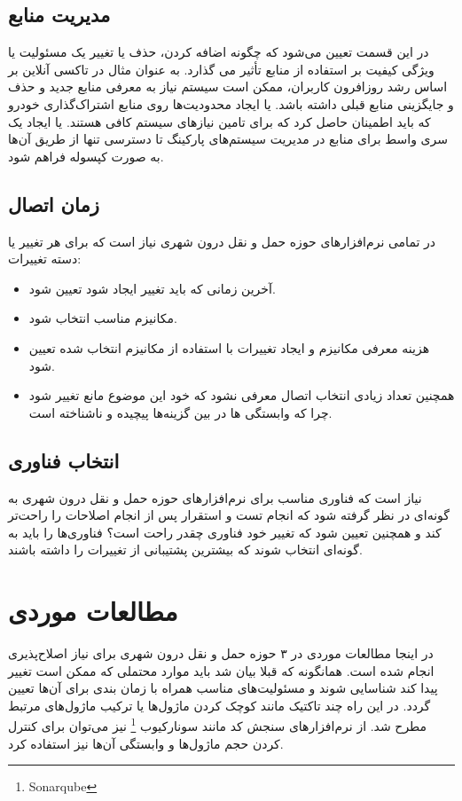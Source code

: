 \subsection{مدیریت منابع}
در این قسمت تعیین می‌شود که چگونه اضافه کردن، حذف یا تغییر یک مسئولیت یا ویژگی کیفیت بر استفاده از منابع تأثیر می گذارد. به عنوان مثال در تاکسی آنلاین بر اساس رشد روزافرون کاربران، ممکن است سیستم نیاز به معرفی منابع جدید و حذف و جایگزینی منابع قبلی داشته باشد. یا ایجاد محدودیت‌ها روی منابع اشتراک‌گذاری خودرو که باید اطمینان حاصل کرد که برای تامین نیازهای سیستم کافی هستند. یا ایجاد یک سری واسط برای منابع در مدیریت سیستم‌های پارکینگ تا دسترسی تنها از طریق آن‌ها به صورت کپسوله فراهم شود.
\subsection{زمان اتصال}
در تمامی نرم‌افزارهای حوزه حمل و نقل درون شهری نیاز است که برای هر تغییر یا دسته تغییرات:
\begin{itemize}
\item
آخرین زمانی که باید تغییر ایجاد شود تعیین شود.
\item
مکانیزم مناسب انتخاب شود.
\item
هزینه معرفی مکانیزم و ایجاد تغییرات با استفاده از مکانیزم انتخاب شده تعیین شود.
\item
همچنین تعداد زیادی انتخاب اتصال معرفی نشود که خود این موضوع مانع تغییر شود چرا که وابستگی ها در بین گزینه‌ها پیچیده و ناشناخته است.
\end{itemize}
\subsection{انتخاب فناوری}
نیاز است که فناوری مناسب برای نرم‌افزارهای حوزه حمل و نقل درون شهری به گونه‌ای در نظر گرفته شود که انجام تست و استقرار پس از انجام اصلاحات را راحت‌تر کند و همچنین تعیین شود که تغییر خود فناوری چقدر راحت است؟ فناوری‌ها را باید به گونه‌ای انتخاب شوند که بیشترین پشتیبانی از تغییرات را داشته باشند.

\section{مطالعات موردی}

در اینجا مطالعات موردی در ۳ حوزه حمل و نقل درون شهری برای نیاز اصلاح‌‌پذیری انجام شده است.
همانگونه که قبلا بیان شد باید موارد محتملی که ممکن است تغییر پیدا کند شناسایی شوند و مسئولیت‌های مناسب همراه با زمان بندی برای آن‌ها تعیین گردد. در این راه چند تاکتیک مانند کوچک کردن ماژول‌ها یا ترکیب ماژول‌های مرتبط مطرح شد.
از نرم‌افزارهای سنجش کد مانند سونارکیوب
\footnote{Sonarqube}
نیز می‌توان برای کنترل کردن حجم ماژول‌ها و وابستگی آن‌ها نیز استفاده کرد. 
